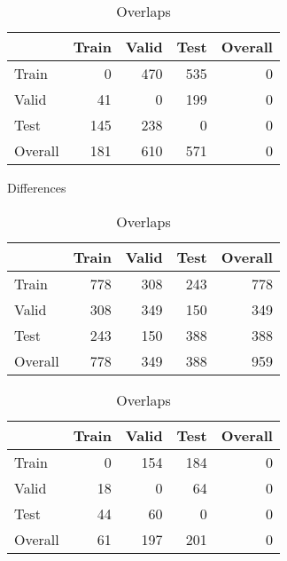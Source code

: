 \documentclass[11pt]{article}
\begin{document}
\begin{table}[t]
    \small
    \centering
    \begin{subtable}[]{\linewidth}
        \centering
        \begin{tabular}{lrrrr}
        \toprule
        {} &  Train &  Valid &  Test &  Overall \\
        \midrule
        Train   &      0 &    470 &   535 &        0 \\
        Valid   &     41 &      0 &   199 &        0 \\
        Test    &    145 &    238 &     0 &        0 \\
        Overall &    181 &    610 &   571 &        0 \\
        \bottomrule
        \end{tabular}
        \caption{Differences}
        \label{tab:splits_table_diff}
    \end{subtable}
    \hfill
    \begin{subtable}[]{\linewidth}
        \centering
        \begin{tabular}{lrrrr}
        \toprule
        {} &  Train &  Valid &  Test &  Overall \\
        \midrule
        Train   &    778 &    308 &   243 &      778 \\
        Valid   &    308 &    349 &   150 &      349 \\
        Test    &    243 &    150 &   388 &      388 \\
        Overall &    778 &    349 &   388 &      959 \\
        \bottomrule
        \end{tabular}
        \caption{Overlaps}
        \label{tab:splits_table_intersection}
    \end{subtable}
    \hfill
    \begin{subtable}[]{\linewidth}
        \centering
        \begin{tabular}{lrrrr}
        \toprule
        {} &  Train &  Valid &  Test &  Overall \\
        \midrule
        Train   &      0 &    154 &   184 &        0 \\
        Valid   &     18 &      0 &    64 &        0 \\
        Test    &     44 &     60 &     0 &        0 \\
        Overall &     61 &    197 &   201 &        0 \\
        \bottomrule
        \end{tabular}

\end{subtable}
\end{table}
\end{document}
